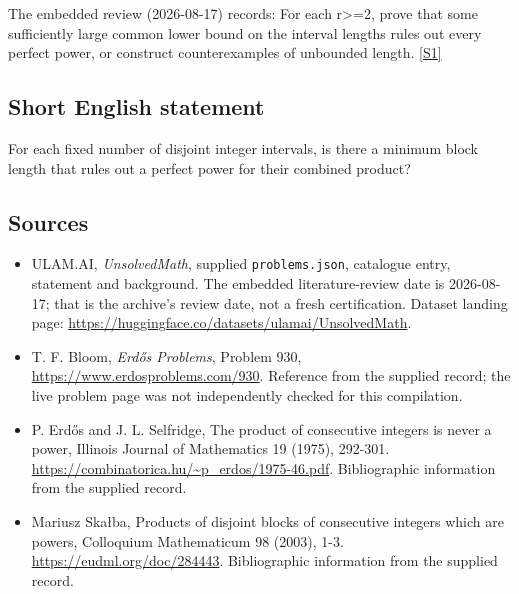\documentclass[11pt,a4paper]{article}
\newcommand{\sref}[2]{\hyperlink{source:#1:#2}{[S#2]}}
\begin{document}
The embedded review (2026-08-17) records: For each r>=2, prove that some sufficiently large common lower bound on the interval lengths rules out every perfect power, or construct counterexamples of unbounded length. \sref{statement}{1}

\subsection{Short English statement}

For each fixed number of disjoint integer intervals, is there a minimum block length that rules out a perfect power for their combined product?

\subsection{Sources}

{\small

\begin{itemize}

\item[\hypertarget{source:statement:1}{S1}] ULAM.AI, \emph{UnsolvedMath}, supplied \texttt{problems.json}, catalogue entry, statement and background. The embedded literature-review date is 2026-08-17; that is the archive’s review date, not a fresh certification. Dataset landing page: \url{https://huggingface.co/datasets/ulamai/UnsolvedMath}.

\item[\hypertarget{source:statement:2}{S2}] T. F. Bloom, \emph{Erdős Problems}, Problem 930, \url{https://www.erdosproblems.com/930}. Reference from the supplied record; the live problem page was not independently checked for this compilation.

\item[\hypertarget{source:statement:3}{S3}] P. Erdős and J. L. Selfridge, The product of consecutive integers is never a power, Illinois Journal of Mathematics 19 (1975), 292-301. \url{https://combinatorica.hu/~p_erdos/1975-46.pdf}. Bibliographic information from the supplied record.

\item[\hypertarget{source:statement:4}{S4}] Mariusz Skałba, Products of disjoint blocks of consecutive integers which are powers, Colloquium Mathematicum 98 (2003), 1-3. \url{https://eudml.org/doc/284443}. Bibliographic information from the supplied record.

\end{itemize}

}

\label{end:statement}
\end{document}
